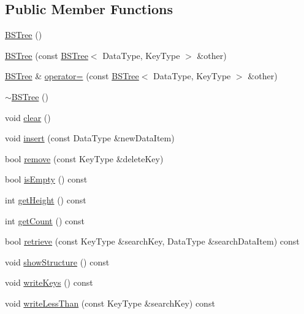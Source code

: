 \subsection*{\-Public \-Member \-Functions}
\begin{DoxyCompactItemize}
\item 
\hyperlink{class_b_s_tree_a4513fc6697f5e51bff8e7c448b446c9e}{\-B\-S\-Tree} ()
\item 
\hyperlink{class_b_s_tree_a6658391c178cb35858c9c465e1839fb0}{\-B\-S\-Tree} (const \hyperlink{class_b_s_tree}{\-B\-S\-Tree}$<$ \-Data\-Type, \-Key\-Type $>$ \&other)
\item 
\hyperlink{class_b_s_tree}{\-B\-S\-Tree} \& \hyperlink{class_b_s_tree_ac36b0b564aa3c411c239d730f506f448}{operator=} (const \hyperlink{class_b_s_tree}{\-B\-S\-Tree}$<$ \-Data\-Type, \-Key\-Type $>$ \&other)
\item 
\hyperlink{class_b_s_tree_a968c51c539f4ae41357c78b6a60fea4c}{$\sim$\-B\-S\-Tree} ()
\item 
void \hyperlink{class_b_s_tree_a926822d08f3d0321603f9fafd2254b16}{clear} ()
\item 
void \hyperlink{class_b_s_tree_ab86b4cea496ee53076021126423d51fd}{insert} (const \-Data\-Type \&new\-Data\-Item)
\item 
bool \hyperlink{class_b_s_tree_a755549f7b88d0178a96ca84afd5e04cf}{remove} (const \-Key\-Type \&delete\-Key)
\item 
bool \hyperlink{class_b_s_tree_a43768375369ca8fe641a86451997ad45}{is\-Empty} () const 
\item 
int \hyperlink{class_b_s_tree_a3850adc6b8ae965ec11ec0e0567b6f7d}{get\-Height} () const 
\item 
int \hyperlink{class_b_s_tree_a880d98553153533d3c29504e8a272c7d}{get\-Count} () const 
\item 
bool \hyperlink{class_b_s_tree_a4359bfee390669b5adaf0380ef62b18d}{retrieve} (const \-Key\-Type \&search\-Key, \-Data\-Type \&search\-Data\-Item) const 
\item 
void \hyperlink{class_b_s_tree_ac28277cacbf8ab33326473a419abf097}{show\-Structure} () const 
\item 
void \hyperlink{class_b_s_tree_a7f08f48e6d1bbe3eb726856a947325e7}{write\-Keys} () const 
\item 
void \hyperlink{class_b_s_tree_a92079e5301185f41eebe1c32c2357258}{write\-Less\-Than} (const \-Key\-Type \&search\-Key) const 
\end{DoxyCompactItemize}
